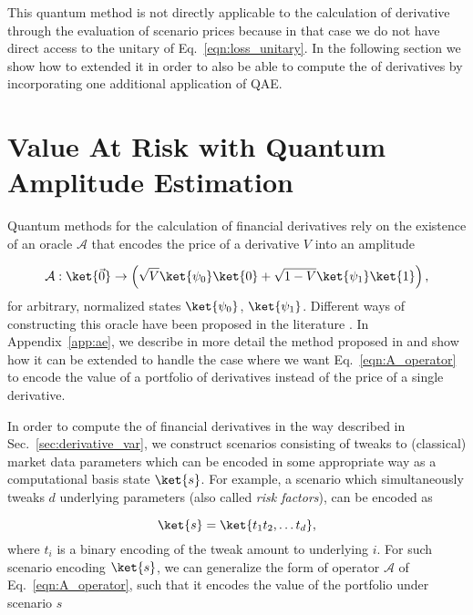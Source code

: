 \begin{enumerate}
This quantum method is not directly applicable to the calculation of derivative \var{} through the evaluation of scenario prices because in that case we do not have direct access to the unitary of Eq.~\eqref{eqn:loss_unitary}.
In the following section we show how to extended it in order to also be able to compute the \var{} of derivatives by incorporating one additional application of QAE.

\section{Value At Risk with Quantum Amplitude Estimation}
\label{sec:qae_var}
Quantum methods for the \var{} calculation of financial derivatives rely on the existence of an oracle $\mathcal{A}$ that encodes the price of a derivative $V$ into an amplitude

\begin{equation}
	\label{eqn:A_operator}
    \mathcal{A} : \ket{\vec{0}} \rightarrow \left( \sqrt{V}\ket{\psi_0}\ket{0} + \sqrt{1-V}\ket{\psi_1}\ket{1} \right),
\end{equation}
for arbitrary, normalized states $\ket{\psi_0}$, $\ket{\psi_1}$.
Different ways of constructing this oracle have been proposed in the literature \cite{rebentrost2018quantum, Stamatopoulos_2020, chakrabarti2021threshold}.
In Appendix~\ref{app:ae}, we describe in more detail the method proposed in \cite{chakrabarti2021threshold} and show how it can be extended to handle the case where we want Eq.~\eqref{eqn:A_operator} to encode the value of a portfolio of derivatives instead of the price of a single derivative.

In order to compute the \var{} of financial derivatives in the way described in Sec.~\ref{sec:derivative_var}, we construct scenarios consisting of tweaks to (classical) market data parameters which can be encoded in some appropriate way as a computational basis state $\ket{s}$.
For example, a scenario which simultaneously tweaks $d$ underlying parameters (also called \emph{risk factors}), can be encoded as

\begin{equation}
	\ket{s}=\ket{t_1 t_2, \dots t_d},
\label{eqn:scenario_encoding}
\end{equation}
where $t_i$ is a binary encoding of the tweak amount to underlying $i$.
For such scenario encoding $\ket{s}$, we can generalize the form of operator $\mathcal{A}$ of Eq.~\eqref{eqn:A_operator}, such that it encodes the value of the portfolio under scenario $s$


\end{enumerate}
